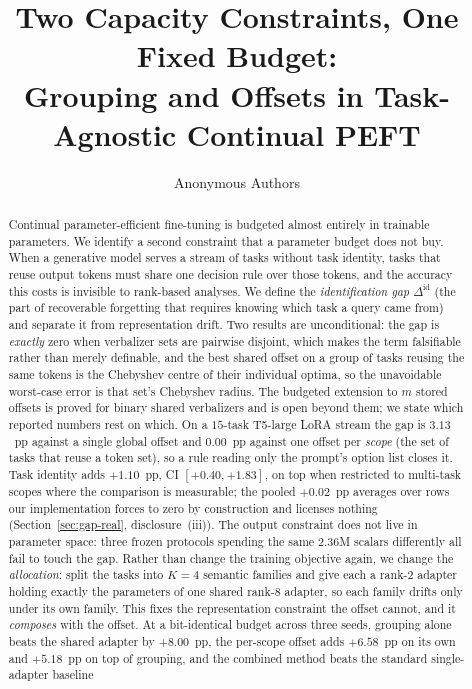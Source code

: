 \documentclass{article}
\title{Two Capacity Constraints, One Fixed Budget:\\
Grouping and Offsets in Task-Agnostic Continual PEFT}
\author{Anonymous Authors}
\begin{document}
\maketitle

\begin{abstract}
Continual parameter-efficient fine-tuning is budgeted almost entirely in
trainable parameters. We identify a second constraint that a parameter budget
does not buy. When a generative model serves a stream of tasks without task
identity, tasks that reuse output tokens must share one decision rule over those
tokens, and the accuracy this costs is invisible to rank-based analyses. We
define the \emph{identification gap} $\Delta^{\mathrm{id}}$ (the part of
recoverable forgetting that requires knowing which task a query came from) and
separate it from representation drift. Two results are unconditional: the gap is
\emph{exactly} zero when verbalizer sets are pairwise disjoint, which makes the
term falsifiable rather than merely definable, and the best shared offset on a
group of tasks reusing the same tokens is the Chebyshev centre of their
individual optima, so the unavoidable worst-case error is that set's Chebyshev
radius. The budgeted extension to $m$ stored offsets is proved for binary shared
verbalizers and is open beyond them; we state which reported numbers rest on
which. On a $15$-task T5-large LoRA stream the gap is $3.13$~pp against a single
global offset and $0.00$~pp against one offset per \emph{scope} (the set of
tasks that reuse a token set), so a rule reading only the prompt's option list
closes it. Task identity adds $+1.10$~pp, CI
$[+0.40,+1.83]$, on top when restricted to multi-task scopes where the comparison
is measurable; the pooled $+0.02$~pp averages over rows our implementation forces
to zero by construction and licenses nothing (Section~\ref{sec:gap-real},
disclosure~(iii)). The output constraint does not live in parameter space: three frozen
protocols spending the same $2.36$M scalars differently all fail to touch the
gap. Rather than change the training objective again, we change the
\emph{allocation}: split the tasks into $K{=}4$ semantic families and give each a
rank-$2$ adapter holding exactly the parameters of one shared rank-$8$ adapter, so
each family drifts only under its own family. This fixes the representation
constraint the offset cannot, and it \emph{composes} with the offset. At a
bit-identical budget across three seeds, grouping alone beats the shared adapter by
$+8.00$~pp, the per-scope offset adds $+6.58$~pp on its own and $+5.18$~pp on top of
grouping, and the combined method beats the standard single-adapter baseline

\end{abstract}
\end{document}
